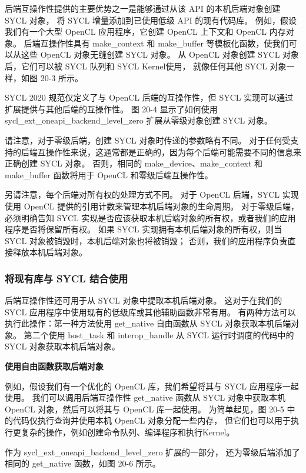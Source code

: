 后端互操作性提供的主要优势之一是能够通过从该 API 的本机后端对象创建 SYCL 对象，
将 SYCL 增量添加到已使用低级 API 的现有代码库。 
例如，假设我们有一个大型 OpenCL 应用程序，它创建 OpenCL 上下文和 OpenCL 内存对象。 
后端互操作性具有 make\_context 和 make\_buffer 等模板化函数，使我们可以从这些 OpenCL 对象无缝创建 SYCL 对象。 
从 OpenCL 对象创建 SYCL 对象后，它们可以被 SYCL 队列和 SYCL Kernel使用，
就像任何其他 SYCL 对象一样，如图 20-3 所示。

SYCL 2020 规范仅定义了与 OpenCL 后端的互操作性，但 SYCL 实现可以通过扩展提供与其他后端的互操作性。 
图 20-4 显示了如何使用 sycl\_ext\_oneapi\_backend\_level\_zero 扩展从零级对象创建 SYCL 对象。

请注意，对于零级后端，创建 SYCL 对象时传递的参数略有不同。 
对于任何受支持的后端互操作性来说，这通常都是正确的，因为每个后端可能需要不同的信息来正确创建 SYCL 对象。 
否则，相同的 make\_device、make\_context 和 make\_buffer 函数将用于 OpenCL 和零级后端互操作性。

另请注意，每个后端对所有权的处理方式不同。 
对于 OpenCL 后端，SYCL 实现使用 OpenCL 提供的引用计数来管理本机后端对象的生命周期。 
对于零级后端，必须明确告知 SYCL 实现是否应该获取本机后端对象的所有权，或者我们的应用程序是否将保留所有权。 
如果 SYCL 实现拥有本机后端对象的所有权，则当 SYCL 对象被销毁时，本机后端对象也将被销毁； 
否则，我们的应用程序负责直接释放本机后端对象。

\subsubsection{将现有库与 SYCL 结合使用}
后端互操作性还可用于从 SYCL 对象中提取本机后端对象。 
这对于在我们的 SYCL 应用程序中使用现有的低级库或其他辅助函数非常有用。 
有两种方法可以执行此操作：第一种方法使用 get\_native 自由函数从 SYCL 对象获取本机后端对象。 
第二个使用 host\_task 和 interop\_handle 从 SYCL 运行时调度的代码中的 SYCL 对象获取本机后端对象。

\textbf{使用自由函数获取后端对象}

例如，假设我们有一个优化的 OpenCL 库，我们希望将其与 SYCL 应用程序一起使用。 
我们可以调用后端互操作性 get\_native 函数从 SYCL 对象中获取本机 OpenCL 对象，然后可以将其与 OpenCL 库一起使用。 
为简单起见，图 20-5 中的代码仅执行查询并使用本机 OpenCL 对象分配一些内存，
但它们也可以用于执行更复杂的操作，例如创建命令队列、编译程序和执行Kernel。

作为 sycl\_ext\_oneapi\_backend\_level\_zero 扩展的一部分，
还为零级后端添加了相同的 get\_native 函数，如图 20-6 所示。

